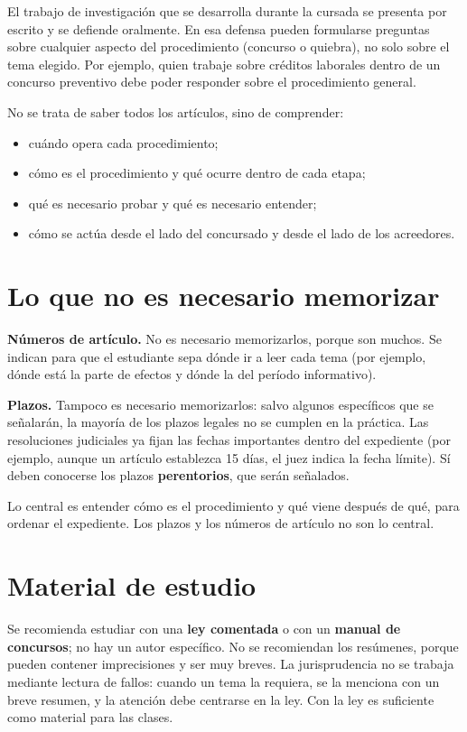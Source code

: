 \documentclass[12pt,oneside]{book}
\begin{document}
El trabajo de investigación que se desarrolla durante la cursada se presenta por escrito y se defiende oralmente. En esa defensa pueden formularse preguntas sobre cualquier aspecto del procedimiento (concurso o quiebra), no solo sobre el tema elegido. Por ejemplo, quien trabaje sobre créditos laborales dentro de un concurso preventivo debe poder responder sobre el procedimiento general.

No se trata de saber todos los artículos, sino de comprender:
\begin{itemize}
    \item cuándo opera cada procedimiento;
    \item cómo es el procedimiento y qué ocurre dentro de cada etapa;
    \item qué es necesario probar y qué es necesario entender;
    \item cómo se actúa desde el lado del concursado y desde el lado de los acreedores.
\end{itemize}

\section{Lo que no es necesario memorizar}

\begin{important}
\textbf{Números de artículo.} No es necesario memorizarlos, porque son muchos. Se indican para que el estudiante sepa dónde ir a leer cada tema (por ejemplo, dónde está la parte de efectos y dónde la del período informativo).

\textbf{Plazos.} Tampoco es necesario memorizarlos: salvo algunos específicos que se señalarán, la mayoría de los plazos legales no se cumplen en la práctica. Las resoluciones judiciales ya fijan las fechas importantes dentro del expediente (por ejemplo, aunque un artículo establezca 15 días, el juez indica la fecha límite). Sí deben conocerse los plazos \textbf{perentorios}, que serán señalados.
\end{important}

Lo central es entender cómo es el procedimiento y qué viene después de qué, para ordenar el expediente. Los plazos y los números de artículo no son lo central.

\section{Material de estudio}

Se recomienda estudiar con una \textbf{ley comentada} o con un \textbf{manual de concursos}; no hay un autor específico. No se recomiendan los resúmenes, porque pueden contener imprecisiones y ser muy breves. La jurisprudencia no se trabaja mediante lectura de fallos: cuando un tema la requiera, se la menciona con un breve resumen, y la atención debe centrarse en la ley. Con la ley es suficiente como material para las clases.
\end{document}
